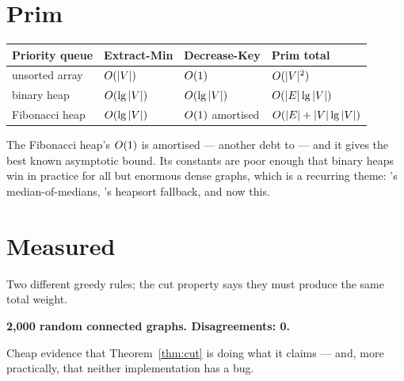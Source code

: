 \section{Prim}


\begin{conceptbox}
\begin{longtable}{@{}L{3.6cm}L{3.2cm}L{3.2cm}L{4.0cm}@{}}
\toprule
{}
\textbf{Priority queue} & \textbf{Extract-Min} & \textbf{Decrease-Key} &
\textbf{Prim total} \\
\midrule
\endhead
unsorted array & $O(|V|)$ & $O(1)$ & $O(|V|^{2})$ \\
binary heap & $O(\operatorname{lg}|V|)$ & $O(\operatorname{lg}|V|)$ & $O(|E|\operatorname{lg}|V|)$ \\
Fibonacci heap & $O(\operatorname{lg}|V|)$ & $O(1)$ amortised &
  $O(|E| + |V|\operatorname{lg}|V|)$ \\
\bottomrule
\end{longtable}

\smallskip
The Fibonacci heap's $O(1)$  is amortised --- another
debt to  --- and it gives the best known asymptotic bound.
Its constants are poor enough that binary heaps win in practice for all but
enormous dense graphs, which is a recurring theme: 's
median-of-medians, 's heapsort fallback, and now this.
\end{conceptbox}

\section{Measured}

\begin{worked}
Two different greedy rules; the cut property says they must produce the same
total weight.
\begin{center}
\textbf{2{,}000 random connected graphs. Disagreements: 0.}
\end{center}
Cheap evidence that Theorem~\ref{thm:cut} is doing what it claims --- and, more
practically, that neither implementation has a bug.
\end{worked}

